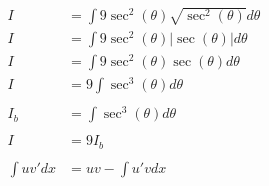 \documentclass[12pt]{article}
\begin{document}
\begin{align}
    \nonumber                                                                                                                                                                                            \\
    I                                                & = \int 9\sec^2(\theta)\sqrt{\sec^2(\theta)} d\theta                                                                                               \\
    I                                                & = \int 9\sec^2(\theta)|\sec(\theta)| d\theta                                                                                                      \\
    I                                                & = \int 9\sec^2(\theta)\sec(\theta) d\theta                                                                                                        \\
    I                                                & = 9\int \sec^3(\theta) d\theta                                                                                                                    \\
    \nonumber                                                                                                                                                                                            \\
    I_b                                              & = \int \sec^3(\theta) d\theta                                                                                                                     \\
    \nonumber                                                                                                                                                                                            \\
    I                                                & = 9I_b                                                                                                                                            \\
    \nonumber                                                                                                                                                                                            \\
    \int uv' dx                                      & = uv - \int u'v dx                                                                                                                                \\

\end{align}
\end{document}
